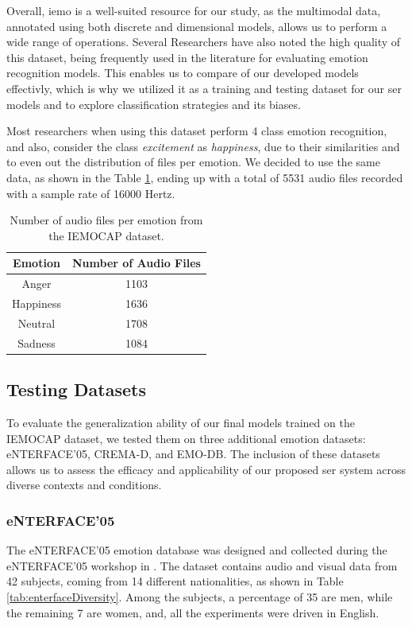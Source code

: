 Overall, \ac{iemo} is a well-suited resource for our study, as the multimodal data, annotated using both discrete and dimensional models, allows us to perform a wide range of operations. Several Researchers have also noted the high quality of this dataset, being frequently used in the literature for evaluating emotion recognition models. This enables us to compare of our developed models effectivly, which is why we utilized it as a training and testing dataset for our \ac{ser} models and to explore classification strategies and its biases.

Most researchers when using this dataset perform 4 class emotion recognition, and also, consider the class \textit{excitement} as \textit{happiness}, due to their similarities and to even out the distribution of files per emotion. We decided to use the same data, as shown in the Table \ref{tab:dataDist}, ending up with a total of 5531 audio files recorded with a sample rate of 16000 Hertz.

\begin{table}[H]
	\centering
	\caption{Number of audio files per emotion from the IEMOCAP dataset.}
	\label{tab:dataDist}
	\begin{tabular}{cc}
		\toprule
		Emotion & Number of Audio Files \\
		\midrule
		Anger 		&  1103\\
		Happiness 	&  1636\\
		Neutral	 	&  1708\\
		Sadness 	&  1084\\
		\bottomrule
	\end{tabular}
\end{table}


\subsection{Testing Datasets}

To evaluate the generalization ability of our final models trained on the IEMOCAP dataset, we tested them on three additional emotion datasets: eNTERFACE’05, CREMA-D, and EMO-DB. The inclusion of these datasets allows us to assess the efficacy and applicability of our proposed \ac{ser} system across diverse contexts and conditions.

\subsubsection{eNTERFACE'05}

The eNTERFACE’05 emotion database \cite{Martin2006} was designed and collected during the eNTERFACE’05 workshop in \citeyear{Martin2006}. The dataset contains audio and visual data from 42 subjects, coming from 14 different nationalities, as shown in Table \ref{tab:enterfaceDiversity}. Among the subjects, a percentage of 35 are men, while the remaining 7 are women, and, all the experiments were driven in English.

